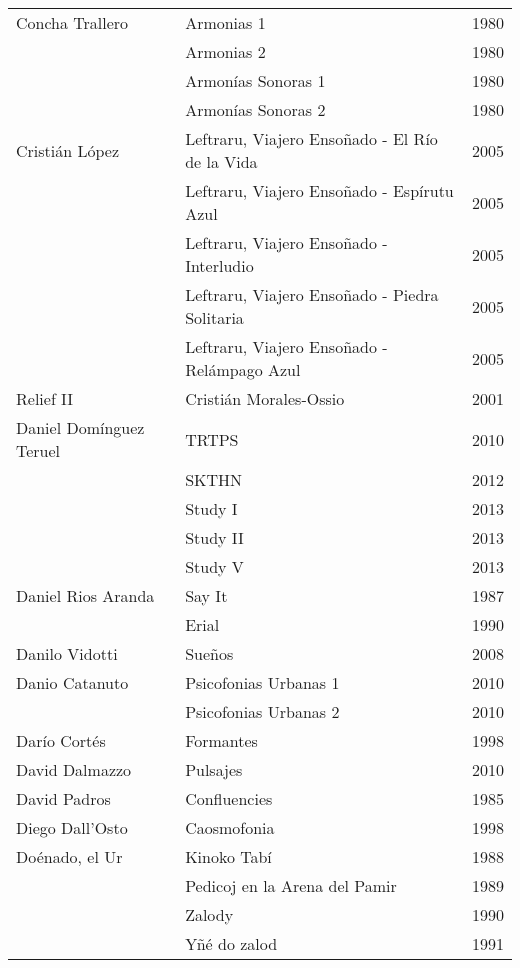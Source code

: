\begin{center}
\begin{longtable}{ p{}  p{}  p{} }
Concha Trallero & Armonias 1 & 1980 \\ \cmidrule (r){2-3} 
& Armonias 2 & 1980 \\ \cmidrule (r){2-3} 
& Armonías Sonoras 1 & 1980 \\ \cmidrule (r){2-3} 
& Armonías Sonoras 2 & 1980 \\ \midrule 
Cristián López & Leftraru, Viajero Ensoñado - El Río de la Vida & 2005 \\ \cmidrule (r){2-3} 
& Leftraru, Viajero Ensoñado - Espírutu Azul & 2005 \\ \cmidrule (r){2-3} 
& Leftraru, Viajero Ensoñado - Interludio & 2005 \\ \cmidrule (r){2-3} 
& Leftraru, Viajero Ensoñado - Piedra Solitaria & 2005 \\ \cmidrule (r){2-3} 
& Leftraru, Viajero Ensoñado - Relámpago Azul & 2005 \\ \midrule 
Relief II & Cristián Morales-Ossio & 2001 \\ \midrule 
Daniel Domínguez Teruel & TRTPS & 2010 \\ \cmidrule (r){2-3} 
& SKTHN & 2012 \\ \cmidrule (r){2-3} 
& Study I & 2013 \\ \cmidrule (r){2-3} 
& Study II & 2013 \\ \cmidrule (r){2-3} 
& Study V & 2013 \\ \midrule
Daniel Rios Aranda & Say It & 1987 \\ \cmidrule (r){2-3} 
& Erial & 1990 \\ \midrule 
Danilo Vidotti & Sueños & 2008 \\ \midrule 
Danio Catanuto & Psicofonias Urbanas 1 & 2010 \\ \cmidrule (r){2-3} 
& Psicofonias Urbanas 2 & 2010 \\ \midrule 
Darío Cortés & Formantes & 1998 \\ \midrule 
David Dalmazzo & Pulsajes & 2010 \\ \midrule 
David Padros & Confluencies & 1985 \\ \midrule 
Diego Dall'Osto & Caosmofonia & 1998 \\ \midrule 
Doénado, el Ur & Kinoko Tabí & 1988 \\ \cmidrule (r){2-3} 
& Pedicoj en la Arena del Pamir & 1989 \\ \cmidrule (r){2-3} 
& Zalody & 1990 \\ \cmidrule (r){2-3} 
& Yñé do zalod & 1991 \\ \cmidrule (r){2-3} 

\end{longtable}
\end{center}
